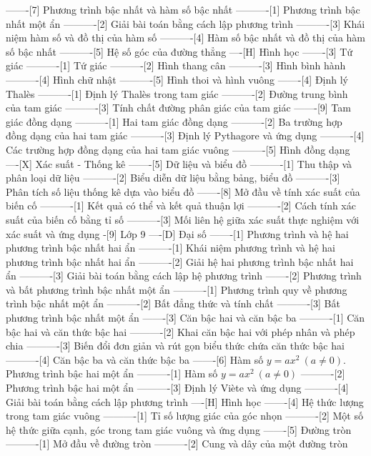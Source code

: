 -------[7] Phương trình bậc nhất và hàm số bậc nhất
----------[1] Phương trình bậc nhất một ẩn
----------[2] Giải bài toán bằng cách lập phương trình
----------[3] Khái niệm hàm số và đồ thị của hàm số
----------[4] Hàm số bậc nhất và đồ thị của hàm số bậc nhất
----------[5] Hệ số góc của đường thẳng
----[H] Hình học
-------[3] Tứ giác
----------[1] Tứ giác
----------[2] Hình thang cân
----------[3] Hình bình hành
----------[4] Hình chữ nhật
----------[5] Hình thoi và hình vuông
-------[4] Định lý Thalès
----------[1] Định lý Thalès trong tam giác
----------[2] Đường trung bình của tam giác
----------[3] Tính chất đường phân giác của tam giác
-------[9] Tam giác đồng dạng
----------[1] Hai tam giác đồng dạng
----------[2] Ba trường hợp đồng dạng của hai tam giác
----------[3] Định lý Pythagore và ứng dụng
----------[4] Các trường hợp đồng dạng của hai tam giác vuông
----------[5] Hình đồng dạng
----[X] Xác suất - Thống kê
-------[5] Dữ liệu và biểu đồ
----------[1] Thu thập và phân loại dữ liệu
----------[2] Biểu diễn dữ liệu bằng bảng, biểu đồ
----------[3] Phân tích số liệu thống kê dựa vào biểu đồ
-------[8] Mở đầu về tính xác suất của biến cố
----------[1] Kết quả có thể và kết quả thuận lợi
----------[2] Cách tính xác suất của biến cố bằng tỉ số
----------[3] Mối liên hệ giữa xác suất thực nghiệm với xác suất và ứng dụng
-[9] Lớp 9
----[D] Đại số
-------[1] Phương trình và hệ hai phương trình bậc nhất hai ẩn
----------[1] Khái niệm phương trình và hệ hai phương trình bậc nhất hai ẩn
----------[2] Giải hệ hai phương trình bậc nhất hai ẩn
----------[3] Giải bài toán bằng cách lập hệ phương trình
-------[2] Phương trình và bất phương trình bậc nhất một ẩn
----------[1] Phương trình quy về phương trình bậc nhất một ẩn
----------[2] Bất đẳng thức và tính chất
----------[3] Bất phương trình bậc nhất một ẩn
-------[3] Căn bậc hai và căn bậc ba
----------[1] Căn bậc hai và căn thức bậc hai
----------[2] Khai căn bậc hai với phép nhân và phép chia
----------[3] Biến đổi đơn giản và rút gọn biểu thức chứa căn thức bậc hai
----------[4] Căn bậc ba và căn thức bậc ba
-------[6] Hàm số $y=ax^2~(a \ne 0)$. Phương trình bậc hai một ẩn
----------[1] Hàm số $y=ax^2~(a \ne 0)$
----------[2] Phương trình bậc hai một ẩn
----------[3] Định lý Viète và ứng dụng
----------[4] Giải bài toán bằng cách lập phương trình
----[H] Hình học
-------[4] Hệ thức lượng trong tam giác vuông
----------[1] Tỉ số lượng giác của góc nhọn
----------[2] Một số hệ thức giữa cạnh, góc trong tam giác vuông và ứng dụng
-------[5] Đường tròn
----------[1] Mở đầu về đường tròn
----------[2] Cung và dây của một đường tròn
